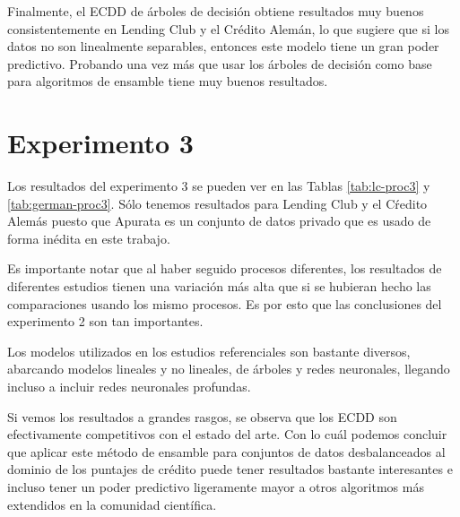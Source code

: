 Finalmente, el \ac{ECDD} de árboles de decisión obtiene resultados muy buenos consistentemente en Lending Club y el Crédito Alemán, lo que sugiere que si los datos no son linealmente separables, entonces este modelo tiene un gran poder predictivo. Probando una vez más que usar los árboles de decisión como base para algoritmos de ensamble tiene muy buenos resultados.



\section{Experimento 3} %

Los resultados del experimento 3 se pueden ver en las Tablas \ref{tab:lc-proc3} y \ref{tab:german-proc3}. Sólo tenemos resultados para Lending Club y el Cŕedito Alemás puesto que Apurata es un conjunto de datos privado que es usado de forma inédita en este trabajo.

Es importante notar que al haber seguido procesos diferentes, los resultados de diferentes estudios tienen una variación más alta que si se hubieran hecho las comparaciones usando los mismo procesos. Es por esto que las conclusiones del experimento 2 son tan importantes.

Los modelos utilizados en los estudios referenciales son bastante diversos, abarcando modelos lineales y no lineales, de árboles y redes neuronales, llegando incluso a incluir redes neuronales profundas.

Si vemos los resultados a grandes rasgos, se observa que los \ac{ECDD} son efectivamente competitivos con el estado del arte. Con lo cuál podemos concluir que aplicar este método de ensamble para conjuntos de datos desbalanceados al dominio de los puntajes de crédito puede tener resultados bastante interesantes e incluso tener un poder predictivo ligeramente mayor a otros algoritmos más extendidos en la comunidad científica.


